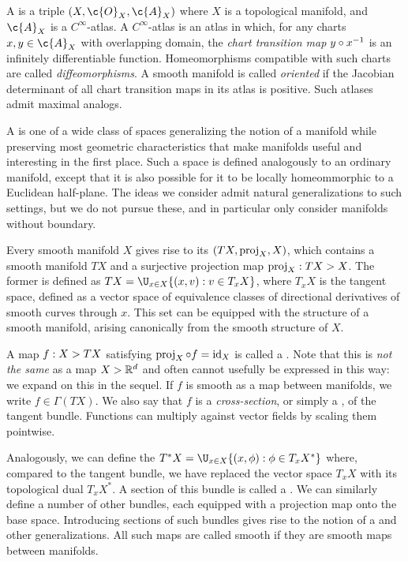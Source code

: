 \documentclass[11pt]{book}
\begin{document}
A  is a triple  $(X,\c{O}_X,\c{A}_X)$ where $X$ is a topological manifold, and $\c{A}_X$ is a $C^\infty$-atlas.
A $C^\infty$-atlas is an atlas in which, for any charts $x,y \in \c{A}_X$ with overlapping domain, the \emph{chart transition map} $y\circ x^{-1}$ is an infinitely differentiable function.
Homeomorphisms compatible with such charts are called \emph{diffeomorphisms}.
A smooth manifold is called \emph{oriented} if the Jacobian determinant of all chart transition maps in its atlas is positive.
Such atlases admit maximal analogs.

A  is one of a wide class of spaces generalizing the notion of a manifold while preserving most geometric characteristics that make manifolds useful and interesting in the first place.
Such a space is defined analogously to an ordinary manifold, except that it is also possible for it to be locally homeommorphic to a Euclidean half-plane.
The ideas we consider admit natural generalizations to such settings, but we do not pursue these, and in particular only consider manifolds without boundary.

Every smooth manifold $X$ gives rise to its  $(TX,\operatorname{proj}_X,X)$, which contains a smooth manifold $TX$ and a surjective projection map $\operatorname{proj}_X : TX \-> X$.
The former is defined as $TX = \U_{x\in X} \{(x,v) : v \in T_x X\}$, where $T_x X$ is the tangent space, defined as a vector space of equivalence classes of directional derivatives of smooth curves through $x$.
This set can be equipped with the structure of a smooth manifold, arising canonically from the smooth structure of $X$.

A map $f : X \-> TX$ satisfying $\operatorname{proj}_X \circ f = \operatorname{id}_X$ is called a .
Note that this is \emph{not the same} as a map $X \-> \mathbb{R}^d$ and often cannot usefully be expressed in this way: we expand on this in the sequel.
If $f$ is smooth as a map between manifolds, we write $f \in \Gamma(TX)$.
We also say that $f$ is a \emph{cross-section}, or simply a , of the tangent bundle.
Functions can multiply against vector fields by scaling them pointwise.

Analogously, we can define the  $T^* X = \U_{x\in X} \{(x,\phi) : \phi \in T_x X^*\}$ where, compared to the tangent bundle, we have replaced the vector space $T_x X$ with its topological dual $T_x X^*$.
A section of this bundle is called a .
We can similarly define a number of other bundles, each equipped with a projection map onto the base space.
Introducing sections of such bundles gives rise to the notion of a  and other generalizations.
All such maps are called smooth if they are smooth maps between manifolds.
\end{document}
